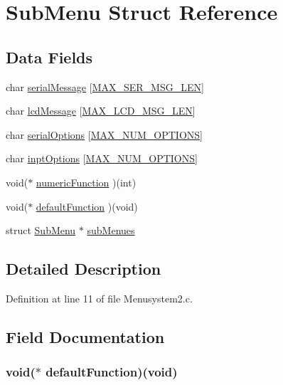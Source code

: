 \hypertarget{struct_sub_menu}{\section{Sub\+Menu Struct Reference}
\label{struct_sub_menu}
}
\subsection*{Data Fields}
\begin{DoxyCompactItemize}
\item 
char \hyperlink{struct_sub_menu_a24706f7b55951b0e21967a256e107936}{serial\+Message} \mbox{[}\hyperlink{_menusystem2_8c_af3a7cb33a5ae7392934b3197ac67e080}{M\+A\+X\+\_\+\+S\+E\+R\+\_\+\+M\+S\+G\+\_\+\+L\+E\+N}\mbox{]}
\item 
char \hyperlink{struct_sub_menu_a10ce8be3d2bbadbc9c262b6be4bb3aec}{lcd\+Message} \mbox{[}\hyperlink{_menusystem2_8c_a803e4f9d2e28d9ab24055cb970ea12c3}{M\+A\+X\+\_\+\+L\+C\+D\+\_\+\+M\+S\+G\+\_\+\+L\+E\+N}\mbox{]}
\item 
char \hyperlink{struct_sub_menu_adcfcbb5b5340baf34c70fb8f4cc66f72}{serial\+Options} \mbox{[}\hyperlink{_menusystem2_8c_ab86e62ee54aa604cfbdc4d3048c2845d}{M\+A\+X\+\_\+\+N\+U\+M\+\_\+\+O\+P\+T\+I\+O\+N\+S}\mbox{]}
\item 
char \hyperlink{struct_sub_menu_aef0980fb751ef312c4ff945539aa3cd4}{inpt\+Options} \mbox{[}\hyperlink{_menusystem2_8c_ab86e62ee54aa604cfbdc4d3048c2845d}{M\+A\+X\+\_\+\+N\+U\+M\+\_\+\+O\+P\+T\+I\+O\+N\+S}\mbox{]}
\item 
void($\ast$ \hyperlink{struct_sub_menu_a1dae2f8dad8e2d2a30b13ee69ea542db}{numeric\+Function} )(int)
\item 
void($\ast$ \hyperlink{struct_sub_menu_ad86a4714605654261200ef4194e1657c}{default\+Function} )(void)
\item 
struct \hyperlink{struct_sub_menu}{Sub\+Menu} $\ast$ \hyperlink{struct_sub_menu_a915aa121e09e4c3f914dc59727f390e3}{sub\+Menues}
\end{DoxyCompactItemize}


\subsection{Detailed Description}


Definition at line 11 of file Menusystem2.\+c.



\subsection{Field Documentation}
\hypertarget{struct_sub_menu_ad86a4714605654261200ef4194e1657c}{
\subsubsection[{default\+Function}]{\setlength{\rightskip}{0pt plus 5cm}void($\ast$ default\+Function)(void)}}\label{struct_sub_menu_ad86a4714605654261200ef4194e1657c}


